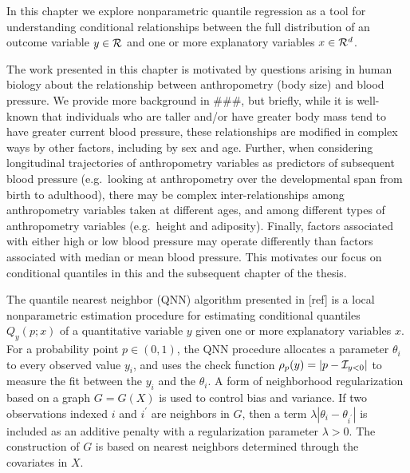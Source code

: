 In this chapter we explore nonparametric quantile regression as a tool
for understanding conditional relationships between the full
distribution of an outcome variable $y\in {\cal R}$ and one or more
explanatory variables $x \in {\cal R}^d$.

The work presented in this chapter is motivated by questions arising
in human biology about the relationship between anthropometry (body
size) and blood pressure.  We provide more background in ###, but
briefly, while it is well-known that individuals who are taller and/or
have greater body mass tend to have greater current blood pressure,
these relationships are modified in complex ways by other factors,
including by sex and age.  Further, when considering longitudinal
trajectories of anthropometry variables as predictors of subsequent
blood pressure (e.g.\ looking at anthropometry over the developmental
span from birth to adulthood), there may be complex
inter-relationships among anthropometry variables taken at different
ages, and among different types of anthropometry variables (e.g.\
height and adiposity).  Finally, factors associated with either high
or low blood pressure may operate differently than factors associated
with median or mean blood pressure.  This motivates our focus on
conditional quantiles in this and the subsequent chapter of the
thesis.

The quantile nearest neighbor (QNN) algorithm presented in [ref] is a
local nonparametric estimation procedure for estimating conditional
quantiles $Q_y(p; x)$ of a quantitative variable $y$ given one or more
explanatory variables $x$.  For a probability point $p \in (0, 1)$,
the QNN procedure allocates a parameter $\theta_i$ to every observed
value $y_i$, and uses the check function $\rho_p(y) = |p - {\cal
I}_{y<0}|$ to measure the fit between the $y_i$ and the $\theta_i$.  A
form of neighborhood regularization based on a graph $G = G(X)$ is
used to control bias and variance.  If two observations indexed $i$
and $i^\prime$ are neighbors in $G$, then a term $\lambda |\theta_i
- \theta_{i^\prime}|$ is included as an additive penalty with a
regularization parameter $\lambda > 0$.  The construction of $G$ is
based on nearest neighbors determined through the covariates in $X$.

